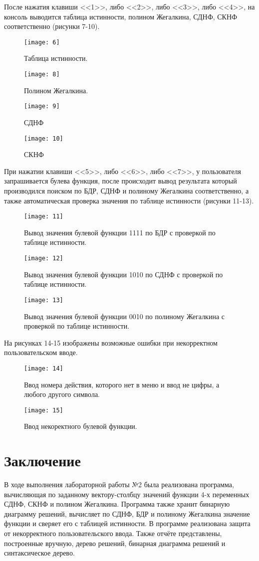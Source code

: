 \documentclass[10pt,a4paper,final]{article} %
\begin{document}
После нажатия клавиши <<1>>, либо <<2>>, либо <<3>>, либо <<4>>, на консоль выводится таблица истинности, полином Жегалкина, СДНФ, СКНФ соответственно  (рисунки 7-10).
	\begin{figure}[h!]
			\centering
	\texttt{[image: 6]}
	\caption{Таблица истинности.}
\end{figure}
	\begin{figure}[h!]
			\centering
	\texttt{[image: 8]}
	\caption{Полином Жегалкина.}
	\texttt{[image: 9]}
	\caption{СДНФ}
	\texttt{[image: 10]}
	\caption{СКНФ}
\end{figure}	
\clearpage

При нажатии клавиши  <<5>>, либо <<6>>, либо <<7>>, у пользователя запрашивается булева функция, после происходит вывод результата который производился поиском по БДР, СДНФ и полиному Жегалкина соответственно, а также автоматическая проверка значения по таблице истинности (рисунки 11-13).
	\begin{figure}[h!]
	\centering
	\texttt{[image: 11]}
	\caption{Вывод значения булевой функции 1111 по БДР с проверкой по таблице истинности.}
	\texttt{[image: 12]}
	\caption{Вывод значения булевой функции 1010 по СДНФ с проверкой по таблице истинности.}
	\texttt{[image: 13]}
	\caption{Вывод значения булевой функции 0010 по полиному Жегалкина с проверкой по таблице истинности.}
\end{figure}	

На рисунках 14-15 изображены возможные ошибки при некорректном пользовательском вводе.
	\begin{figure}[h!]
	\centering
	\texttt{[image: 14]}
	\caption{Ввод номера действия, которого нет в меню и ввод не цифры, а любого другого символа.}
	\texttt{[image: 15]}
	\caption{Ввод некоректного булевой функции.}
\end{figure}	
\clearpage
\section* {Заключение}

В ходе выполнения лабораторной работы №2 была реализована программа, вычисляющая по заданному вектору-столбцу значений функции 4-х переменных СДНФ, СКНФ и полином Жегалкина. Программа также  хранит бинарную диаграмму решений, вычисляет по СДНФ, БДР и полиному Жегалкина значение функции и сверяет его с таблицей истинности. В программе реализована защита от некорректного пользовательского ввода. Также отчёте
представлены, построенные вручную, дерево решений, бинарная диаграмма решений и синтаксическое дерево.
\end{document}
